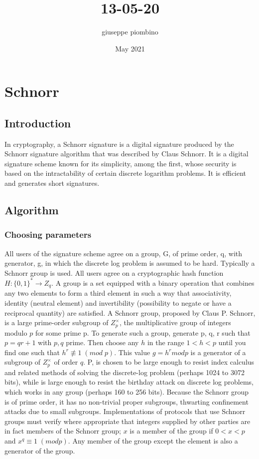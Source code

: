 \documentclass{article}
\title{13-05-20}
\author{giuseppe piombino}
\date{May 2021}
\begin{document}
\maketitle

\section{Schnorr}
\subsection{Introduction}
In cryptography, a Schnorr signature is a digital signature produced by the Schnorr signature algorithm that was described by Claus Schnorr. It is a digital signature scheme known for its simplicity, among the first, whose security is based on the intractability of certain discrete logarithm problems. It is efficient and generates short signatures.
\subsection{Algorithm}
\subsubsection{Choosing parameters}
All users of the signature scheme agree on a group, G, of prime order, q, with generator,  g, in which the discrete log problem is assumed to be hard. Typically a Schnorr group is used.
All users agree on a cryptographic hash function $H:\{0,1\}^{*} \rightarrow {{Z}}_{q}$. 
A group is a set equipped with a binary operation that combines any two elements to form a third element in such a way that associativity, identity (neutral element) and invertibility (possibility to negate or have a reciprocal quantity) are satisfied.
A Schnorr group, proposed by Claus P. Schnorr, is a large prime-order subgroup of ${  {Z} _{p}^{\times }}$, the multiplicative group of integers modulo ${ p}$ for some prime  p. To generate such a group, generate p, q, r such that ${ p=qr+1}$ with ${ p} , { q}$  prime. Then choose any ${ h}$  in the range ${ 1<h<p}$  until you find one such that
${ h^{r}\not \equiv 1\;({{mod}}\;p)} $.
This value
${ g=h^{r}{{ mod }}p}$ 
is a generator of a subgroup of ${ {Z} _{p}^{\times }}$  of order ${ q}$.
P, is chosen to be large enough to resist index calculus and related methods of solving the discrete-log problem (perhaps 1024 to 3072 bits), while   is large enough to resist the birthday attack on discrete log problems, which works in any group (perhaps 160 to 256 bits). Because the Schnorr group is of prime order, it has no non-trivial proper subgroups, thwarting confinement attacks due to small subgroups. Implementations of protocols that use Schnorr groups must verify where appropriate that integers supplied by other parties are in fact members of the Schnorr group; ${ x}$ is a member of the group if ${ 0<x<p}$ and ${ x^{q}\equiv 1\;({{mod }}p)}$. Any member of the group except the element   is also a generator of the group.
\end{document}
